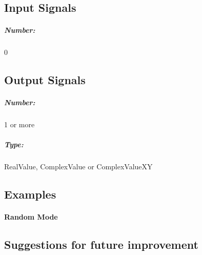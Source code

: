 
\subsection*{Input Signals}


\subparagraph*{Number:} 0

\subsection*{Output Signals}

\subparagraph*{Number:} 1 or more

\subparagraph*{Type:} RealValue, ComplexValue or ComplexValueXY

\subsection*{Examples}

\paragraph*{Random Mode}

\subsection*{Suggestions for future improvement}
